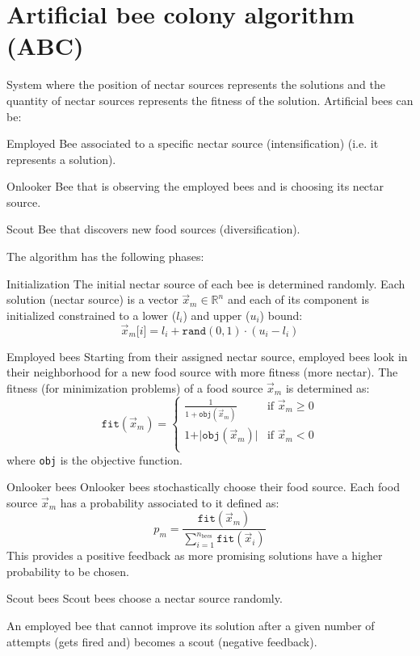 \section{Artificial bee colony algorithm (ABC)}

System where the position of nectar sources represents the solutions and
the quantity of nectar sources represents the fitness of the solution.
Artificial bees can be:
\begin{descriptionlist}
    \item[Employed] 
        Bee associated to a specific nectar source (intensification) (i.e. it represents a solution).
    \item[Onlooker]
        Bee that is observing the employed bees and is choosing its nectar source.
    \item[Scout]
        Bee that discovers new food sources (diversification).
\end{descriptionlist}

The algorithm has the following phases:
\begin{descriptionlist}
    \item[Initialization] 
        The initial nectar source of each bee is determined randomly.
        Each solution (nectar source) is a vector $\vec{x}_m \in \mathbb{R}^n$ and 
        each of its component is initialized constrained to a lower ($l_i$) and upper ($u_i$) bound:
        \[ \vec{x}_m\texttt{[}i\texttt{]} = l_i + \texttt{rand}(0, 1) \cdot (u_i - l_i) \]
    
    \item[Employed bees] 
        Starting from their assigned nectar source, employed bees look in their neighborhood for a new food source with more fitness (more nectar).
        The fitness (for minimization problems) of a food source $\vec{x}_m$ is determined as:
        \[ \texttt{fit}(\vec{x}_m) = \begin{cases}
            \frac{1}{1 + \texttt{obj}(\vec{x}_m)}   & \text{if } \vec{x}_m \geq 0 \\
            1 + \vert \texttt{obj}(\vec{x}_m) \vert & \text{if } \vec{x}_m < 0 \\
        \end{cases} \]
        where \texttt{obj} is the objective function.

    \item[Onlooker bees] 
        Onlooker bees stochastically choose their food source.
        Each food source $\vec{x}_m$ has a probability associated to it defined as:
        \[ p_m = \frac{\texttt{fit}(\vec{x}_m)}{\sum_{i=1}^{n_\text{bees}} \texttt{fit}(\vec{x}_i)} \]
        This provides a positive feedback as more promising solutions have a higher probability to be chosen.

    \item[Scout bees] 
        Scout bees choose a nectar source randomly.

        An employed bee that cannot improve its solution after a given number of attempts {\tiny(gets fired and)} becomes a scout (negative feedback).
\end{descriptionlist}

